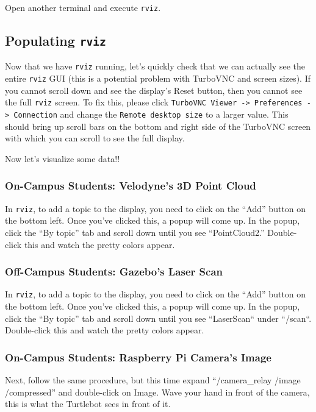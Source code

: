 \documentclass{article}
\begin{document}
Open another terminal and execute \texttt{rviz}.

\subsection{Populating \texttt{rviz}}

Now that we have \texttt{rviz} running, let's quickly check that we can actually see the entire \texttt{rviz} GUI (this is a potential problem with TurboVNC and screen sizes). If you cannot scroll down and see the display's Reset button, then you cannot see the full \texttt{rviz} screen. To fix this, please click \texttt{TurboVNC Viewer -> Preferences -> Connection} and change the \texttt{Remote desktop size} to a larger value. This should bring up scroll bars on the bottom and right side of the TurboVNC screen with which you can scroll to see the full display.

Now let's visualize some data!!

\subsubsection{On-Campus Students: Velodyne's 3D Point Cloud}

In \texttt{rviz}, to add a topic to the display, you need to click on the ``Add'' button on the bottom left. Once you've clicked this, a popup will come up. In the popup, click the ``By topic'' tab and scroll down until you see ``PointCloud2.'' Double-click this and watch the pretty colors appear.

\subsubsection{Off-Campus Students: Gazebo's Laser Scan}

In \texttt{rviz}, to add a topic to the display, you need to click on the ``Add'' button on the bottom left. Once you've clicked this, a popup will come up. In the popup, click the ``By topic'' tab and scroll down until you see ``LaserScan`` under ``/scan``. Double-click this and watch the pretty colors appear.

\subsubsection{On-Campus Students: Raspberry Pi Camera's Image}

Next, follow the same procedure, but this time expand ``/camera\_relay /image /compressed'' and double-click on Image. Wave your hand in front of the camera, this is what the Turtlebot sees in front of it.
\end{document}
